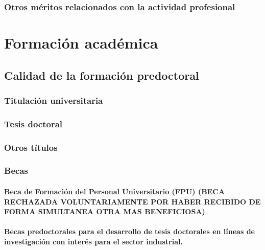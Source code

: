 \documentclass[a4paper, 11pt, twoside, openright]{report}
\begin{document}
\subsection{Otros méritos relacionados con la actividad profesional}

\chapter{Formación académica}



\section{Calidad de la formación predoctoral}

\subsection{Titulación universitaria}



\subsection{Tesis doctoral}



\subsection{Otros títulos}

\subsection{Becas}

\subsubsection{Beca de Formación del Personal Universitario (FPU) (BECA RECHAZADA VOLUNTARIAMENTE POR HABER RECIBIDO DE FORMA SIMULTANEA OTRA MAS BENEFICIOSA)}


\subsubsection{Becas predoctorales para el desarrollo de tesis doctorales en líneas de investigación con interés para el sector industrial.}

\end{document}
